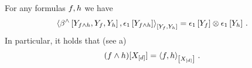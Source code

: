 \begin{theorem}
    \label{the:effectiveConjunction}
    For any formulas $f,h$ we have
    \begin{align*}
        \contractionof{
            \bencodingofat{\land}{\headvariableof{\exformula\land\secexformula},\formulavar,\secexformulavar},\tbasisat{\headvariableof{\exformula\land\secexformula}}
        }{\formulavar,\secexformulavar}
        = \tbasisat{\formulavar} \otimes \tbasisat{\secexformulavar} \, .
    \end{align*}
    In particular, it holds that (see a)
    \begin{align*}
    (f\land h)[X_{[d]}]
        = \left\langle f,h\right\rangle_{\left[ X_{[d]} \right]} \, .
    \end{align*}
\end{theorem}
